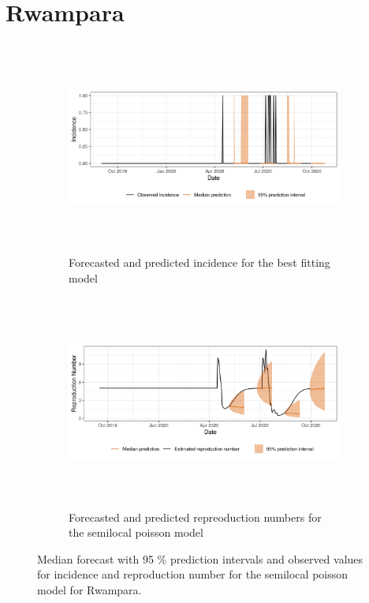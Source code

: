  \section{ Rwampara }\begin{figure}[H]\begin{subfigure}{\textwidth}  \centering  \includegraphics[width=0.9\linewidth, height=7cm]{../output/Rwampara_predictions.png}  \caption{Forecasted and predicted incidence for the best fitting model}\end{subfigure}

\begin{subfigure}{\textwidth}  \centering  \includegraphics[width=0.9\linewidth, height=7cm]{../output/Rwampara_Rs.png}  \caption{Forecasted and predicted repreoduction numbers for the semilocal poisson model}\end{subfigure}  \caption{Median forecast with 95 \% prediction intervals and observed values for incidence and reproduction number for the semilocal poisson model for Rwampara.}\end{figure}

